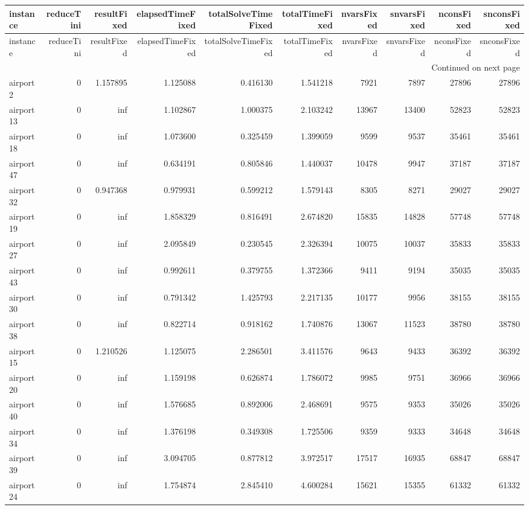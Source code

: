 \begin{longtable}{|l|r|r|r|r|r|r|r|r|r|}
\toprule
instance & reduceTini & resultFixed & elapsedTimeFixed & totalSolveTimeFixed & totalTimeFixed & nvarsFixed & snvarsFixed & nconsFixed & snconsFixed \\
\midrule
\endfirsthead
\toprule
instance & reduceTini & resultFixed & elapsedTimeFixed & totalSolveTimeFixed & totalTimeFixed & nvarsFixed & snvarsFixed & nconsFixed & snconsFixed \\
\midrule
\endhead
\midrule
\multicolumn{10}{r}{Continued on next page} \\
\midrule
\endfoot
\bottomrule
\endlastfoot
airport2 & 0 & 1.157895 & 1.125088 & 0.416130 & 1.541218 & 7921 & 7897 & 27896 & 27896 \\
airport13 & 0 & inf & 1.102867 & 1.000375 & 2.103242 & 13967 & 13400 & 52823 & 52823 \\
airport18 & 0 & inf & 1.073600 & 0.325459 & 1.399059 & 9599 & 9537 & 35461 & 35461 \\
airport47 & 0 & inf & 0.634191 & 0.805846 & 1.440037 & 10478 & 9947 & 37187 & 37187 \\
airport32 & 0 & 0.947368 & 0.979931 & 0.599212 & 1.579143 & 8305 & 8271 & 29027 & 29027 \\
airport19 & 0 & inf & 1.858329 & 0.816491 & 2.674820 & 15835 & 14828 & 57748 & 57748 \\
airport27 & 0 & inf & 2.095849 & 0.230545 & 2.326394 & 10075 & 10037 & 35833 & 35833 \\
airport43 & 0 & inf & 0.992611 & 0.379755 & 1.372366 & 9411 & 9194 & 35035 & 35035 \\
airport30 & 0 & inf & 0.791342 & 1.425793 & 2.217135 & 10177 & 9956 & 38155 & 38155 \\
airport38 & 0 & inf & 0.822714 & 0.918162 & 1.740876 & 13067 & 11523 & 38780 & 38780 \\
airport15 & 0 & 1.210526 & 1.125075 & 2.286501 & 3.411576 & 9643 & 9433 & 36392 & 36392 \\
airport20 & 0 & inf & 1.159198 & 0.626874 & 1.786072 & 9985 & 9751 & 36966 & 36966 \\
airport40 & 0 & inf & 1.576685 & 0.892006 & 2.468691 & 9575 & 9353 & 35026 & 35026 \\
airport34 & 0 & inf & 1.376198 & 0.349308 & 1.725506 & 9359 & 9333 & 34648 & 34648 \\
airport39 & 0 & inf & 3.094705 & 0.877812 & 3.972517 & 17517 & 16935 & 68847 & 68847 \\
airport24 & 0 & inf & 1.754874 & 2.845410 & 4.600284 & 15621 & 15355 & 61332 & 61332 \\

\end{longtable}
